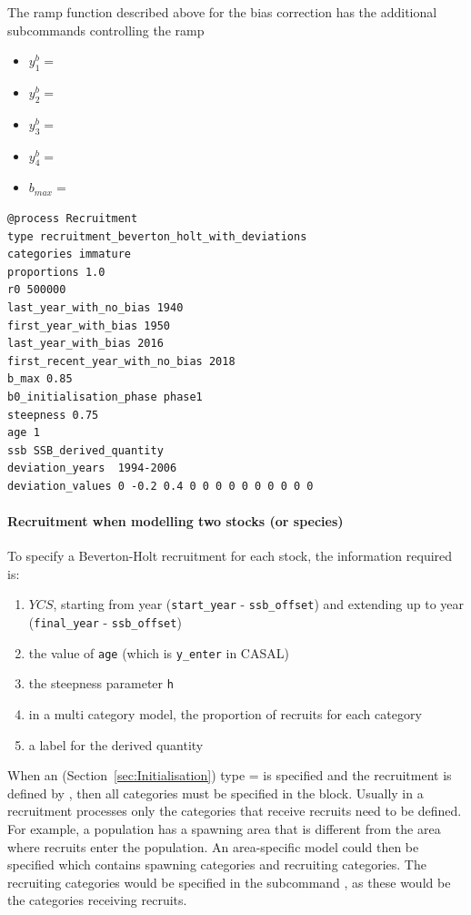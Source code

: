 The ramp function described above for the bias correction has the additional subcommands controlling the ramp

\begin{itemize}
	\item $y_1^b = $ 
	\item $y_2^b = $ 
	\item $y_3^b = $ 
	\item $y_4^b = $ 
	\item $b_{max} = $ 
\end{itemize}

{\small{\begin{verbatim}
@process Recruitment
type recruitment_beverton_holt_with_deviations
categories immature
proportions 1.0
r0 500000
last_year_with_no_bias 1940
first_year_with_bias 1950
last_year_with_bias 2016
first_recent_year_with_no_bias 2018
b_max 0.85
b0_initialisation_phase phase1
steepness 0.75
age 1
ssb SSB_derived_quantity
deviation_years  1994-2006
deviation_values 0 -0.2 0.4 0 0 0 0 0 0 0 0 0 0
\end{verbatim}}}

\paragraph*{Recruitment when modelling two stocks (or species)}

To specify a Beverton-Holt recruitment for each stock, the information required is:

\begin{enumerate}
	\item $YCS$, starting from year (\texttt{start\_year} - \texttt{ssb\_offset}) and extending up to year (\texttt{final\_year} - \texttt{ssb\_offset})
	\item the value of \texttt{age} (which is \texttt{y\_enter} in CASAL)
	\item the steepness parameter \texttt{h}
	\item in a multi category model, the proportion of recruits for each category
	\item a label for the derived quantity
\end{enumerate}

When an  (Section~\ref{sec:Initialisation}) type =  is specified and the recruitment is defined by , then all categories must be specified in the  block. Usually in a recruitment processes only the categories that receive recruits need to be defined. For example, a population has a spawning area that is different from the area where recruits enter the population. An area-specific model could then be specified which contains spawning categories and recruiting categories. The recruiting categories would be specified in the subcommand , as these would be the categories receiving recruits.

